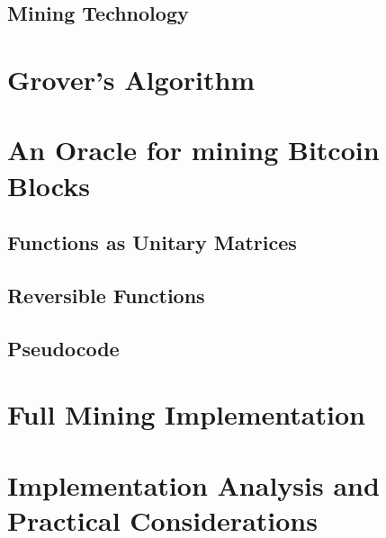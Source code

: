 \documentclass[11pt]{article} %
\begin{document}
\subsection{Mining Technology}


\section{Grover's Algorithm}{}


\section{An Oracle for mining Bitcoin Blocks}{}

\subsection{Functions as Unitary Matrices}{}
\subsection{Reversible Functions}{}
\subsection{Pseudocode}{}

\section{Full Mining Implementation}{}

\section{Implementation Analysis and Practical Considerations}{}
\end{document}
